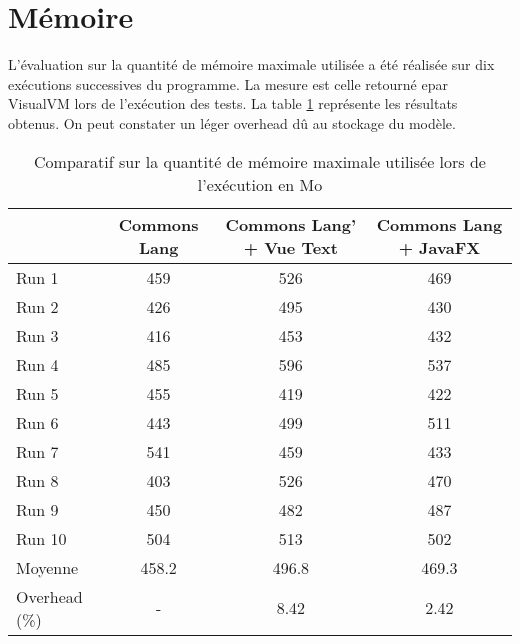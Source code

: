 \section{Mémoire}
\label{memoire}

L'évaluation sur la quantité de mémoire maximale utilisée a été réalisée sur dix exécutions successives du programme. La mesure est celle retourné epar VisualVM lors de l'exécution des tests. La table \ref{evaluation_memoire} représente les résultats obtenus. On peut constater un léger overhead dû au stockage du modèle.

\begin{table}[H]
\centering
\begin{tabular}{|l|c|c|c|}
\hline
         & Commons Lang & Commons Lang' + Vue Text & Commons Lang + JavaFX\\
         \hline
Run 1     & 459  & 526       & 469        \\
Run 2     & 426  & 495       & 430        \\
Run 3     & 416  & 453       & 432        \\
Run 4     & 485  & 596       & 537        \\
Run 5     & 455  & 419       & 422        \\
Run 6     & 443  & 499       & 511        \\
Run 7     & 541  & 459       & 433        \\
Run 8     & 403  & 526       & 470        \\
Run 9     & 450  & 482       & 487        \\
Run 10    & 504  & 513       & 502        \\
\hline
Moyenne  & 458.2  & 496.8       & 469.3        \\
\hline
Overhead (\%) & -  & 8.42       & 2.42   \\
\hline    
\end{tabular}
\caption{Comparatif sur la quantité de mémoire maximale utilisée lors de l'exécution en Mo}
\label{evaluation_memoire}
\end{table}
